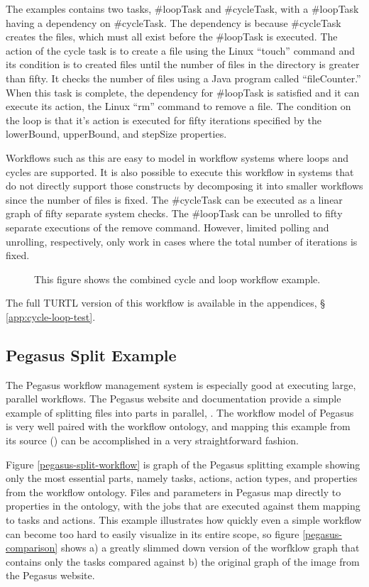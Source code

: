 The examples contains two tasks, \#loopTask and \#cycleTask, with a \#loopTask
having a dependency on \#cycleTask. The dependency is because \#cycleTask
creates the files, which must all exist before the \#loopTask is executed. The
action of the cycle task is to create a file using the Linux ``touch'' command
and its condition is to created files until the number of files in the directory
is greater than fifty. It checks the number of files using a Java program called
``fileCounter.'' When this task is complete, the dependency for \#loopTask is
satisfied and it can execute its action, the Linux ``rm'' command to remove a
file. The condition on the loop is that it's action is executed for fifty
iterations specified by the lowerBound, upperBound, and stepSize properties.

Workflows such as this are easy to model in workflow systems where loops and
cycles are supported. It is also possible to execute this workflow in systems
that do not directly support those constructs by decomposing it into smaller
workflows since the number of files is fixed. The \#cycleTask can be
executed as a linear graph of fifty separate system checks. The \#loopTask can
be unrolled to fifty separate executions of the remove command. However, limited
polling and unrolling, respectively, only work in cases where the total number
of iterations is fixed.

\begin{figure}[htbp]
\centering
{}
\caption{This figure shows the combined cycle and loop workflow example.}
\label{cycle-loop-test}
\end{figure}

The full TURTL version of this workflow is available in the appendices, \S
\ref{app:cycle-loop-test}.

\subsection{Pegasus Split Example}

The Pegasus workflow management system is especially good at executing large,
parallel workflows. The Pegasus website and documentation provide a simple
example of splitting files into parts in parallel, \cite{}. The workflow model
of Pegasus is very well paired with the workflow ontology, and mapping this
example from its source (\cite{}) can be accomplished in a very straightforward
fashion.

Figure \ref{pegasus-split-workflow} is graph of the Pegasus splitting example
showing only the most essential parts, namely tasks, actions, action types, and
properties from the workflow ontology. Files and parameters in Pegasus map
directly to properties in the ontology, with the jobs that are executed against
them mapping to tasks and actions. This example illustrates how quickly even a
simple workflow can become too hard to easily visualize in its entire scope, so
figure \ref{pegasus-comparison} shows a) a greatly slimmed down version of the
worfklow graph that contains only the tasks compared against b) the original
graph of the image from the Pegasus website.

